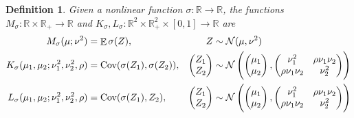 \documentclass[oneside, article]{memoir}
\newtheorem{definition}{Definition}
\DeclareMathOperator{\expect}{\mathbb{E}}
\DeclareMathOperator{\Cov}{\operatorname{Cov}}
\begin{document}
\begin{definition}
  \label{def:moment-maps}
  Given a nonlinear function \(\sigma: \mathbb{R} \to \mathbb R\),
  the functions \(M_\sigma: \mathbb{R}  \times \mathbb{R}_+ \to
  \mathbb{R}\) and \(K_\sigma, L_\sigma: \mathbb{R}^2 \times \mathbb
  R_+^2 \times [0, 1] \to \mathbb{R}\) are
  \begin{align*}
    M_\sigma(\mu; \nu^2) &= \expect{\sigma(Z)},
    & Z &\sim \mathcal N(\mu, \nu^2)
    \\
    K_\sigma(\mu_1, \mu_2; \nu_1^2, \nu_2^2, \rho) &= \Cov
    (\sigma(Z_1), \sigma(Z_2)),
    &
    \begin{pmatrix}
      Z_1 \\ Z_2
    \end{pmatrix} &\sim \mathcal N\del{
      \begin{pmatrix}
        \mu_1 \\ \mu_2
      \end{pmatrix},
      \begin{pmatrix}
        \nu_1^2 & \rho \nu_1 \nu_2 \\
        \rho \nu_1 \nu_2 & \nu_2^2
      \end{pmatrix}
    }
    \\
    L_\sigma(\mu_1, \mu_2; \nu_1^2, \nu_2^2, \rho) &= \Cov
    (\sigma(Z_1), Z_2),
    &
    \begin{pmatrix}
      Z_1 \\ Z_2
    \end{pmatrix} &\sim \mathcal N\del{
      \begin{pmatrix}
        \mu_1 \\ \mu_2
      \end{pmatrix},
      \begin{pmatrix}
        \nu_1^2 & \rho \nu_1 \nu_2 \\
        \rho \nu_1 \nu_2 & \nu_2^2
      \end{pmatrix}
    }
    \\
  \end{align*}
\end{definition}

\end{document}

